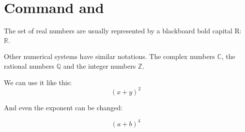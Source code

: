 
\newcommand*{\R}{\mathbb{R}}
\newcommand*{\bb}[1]{\mathbb{#1}}
\newcommand{\plusbinomial}[3][2]{(#2 + #3)^#1}

\newenvironment{xboxed}[2][This is a box]
{\begin{center}
		Argument 1 (\#1)=#1\\[1ex]
		\begin{tabular}{{{!}}p{0.9\textwidth}{{!}}}
			\hline\\
			Argument 2 (\#2)=#2\\[2ex]
		}
		{ 
			\\\\\hline
		\end{tabular} 
	\end{center}
}

\chapter[Command and Environment]{Command and }

The set of real numbers are usually represented 
by a blackboard bold capital R: \( \R \).

Other numerical systems have similar notations. 
The complex numbers \( \bb{C} \), the rational 
numbers \( \bb{Q} \) and the integer numbers \( \bb{Z} \).

We can use it like this: \[ \plusbinomial{x}{y} \]

And even the exponent can be changed:

\[ \plusbinomial[4]{a}{b} \]